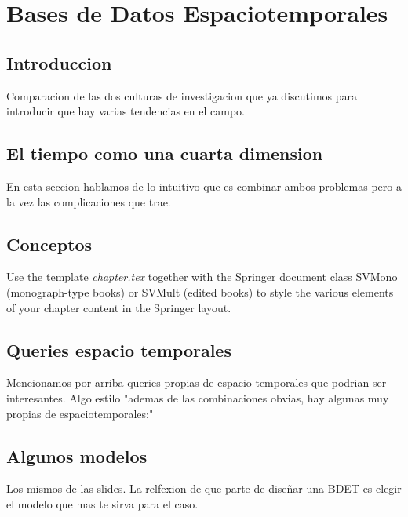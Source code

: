 \chapter{Bases de Datos Espaciotemporales}  \label{cap:et}

\section{Introduccion}
\label{sec:1}
Comparacion de las dos culturas de investigacion que ya discutimos para introducir que hay varias tendencias en el campo.

\section{El tiempo como una cuarta dimension}
\label{sec:2}
En esta seccion hablamos de lo intuitivo que es combinar ambos problemas pero a la vez las complicaciones que trae.

\section{Conceptos}
\label{sec:3}
Use the template \emph{chapter.tex} together with the Springer document class SVMono (monograph-type books) or SVMult (edited books) to style the various elements of your chapter content in the Springer layout.

\section{Queries espacio temporales}
\label{sec:4}
Mencionamos por arriba queries propias de espacio temporales que podrian ser interesantes. Algo estilo "ademas de las combinaciones obvias, hay algunas muy propias de espaciotemporales:"

\section{Algunos modelos}
\label{sec:5}
Los mismos de las slides. La relfexion de que parte de diseñar una BDET es elegir el modelo que mas te sirva para el caso.

% 